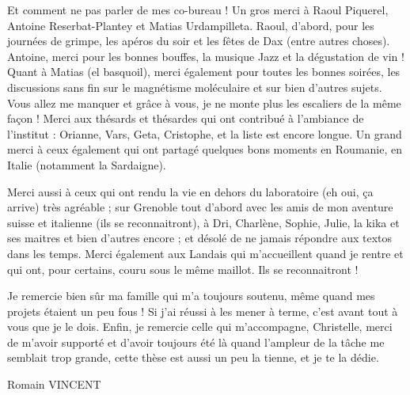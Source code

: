 Et comment ne pas parler de mes co-bureau ! Un gros merci à Raoul Piquerel, Antoine Reserbat-Plantey et Matias Urdampilleta. Raoul, d'abord, pour les journées de grimpe, les apéros du soir et les fêtes de Dax (entre autres choses). Antoine, merci pour les bonnes bouffes, la musique Jazz et la dégustation de vin ! Quant à Matias (el basquoil), merci également pour toutes les bonnes soirées, les discussions sans fin sur le magnétisme moléculaire et sur bien d'autres sujets. Vous allez me manquer et grâce à vous, je ne monte plus les escaliers de la même façon !
Merci aux thésards et thésardes qui ont contribué à l'ambiance de l'institut : Orianne, Vars, Geta, Cristophe, et la liste est encore longue. Un grand merci à ceux également qui ont partagé quelques bons moments en Roumanie, en Italie (notamment la Sardaigne).


Merci aussi à ceux qui ont rendu la vie en dehors du laboratoire (eh oui, ça arrive) très agréable ; sur Grenoble tout d'abord avec les amis de mon aventure suisse et italienne (ils se reconnaitront), à Dri, Charlène, Sophie, Julie, la kika et ses maitres et bien d'autres encore ; et désolé de ne jamais répondre aux textos dans les temps. Merci également aux Landais qui m'accueillent quand je rentre et qui ont, pour certains, couru sous le même maillot. Ils se reconnaitront !


Je remercie bien sûr ma famille qui m'a toujours soutenu, même quand mes projets étaient un peu fous ! Si j'ai réussi à les mener à terme, c'est avant tout à vous que je le dois. Enfin, je remercie celle qui m'accompagne, Christelle, merci de m'avoir supporté et d'avoir toujours été là quand l'ampleur de la tâche me semblait trop grande, cette thèse est aussi un peu la tienne, et je te la dédie.

\vspace{1cm}
\hspace{8cm} Romain VINCENT